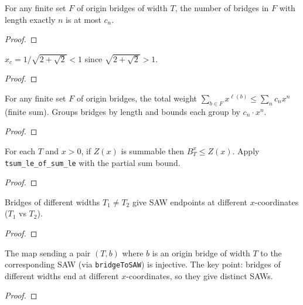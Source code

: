 \begin{lemma}\label{lem:bridge_count_le}
\leanok
{}
  For any finite set $F$ of origin bridges of width $T$, the number of
  bridges in $F$ with length exactly $n$ is at most $c_n$.
\end{lemma}
\begin{proof}
\leanok
{}
\end{proof}

\begin{lemma}[$x_c < 1$]\label{lem:xc_lt_one}
\leanok
{}
  $x_c = 1/\sqrt{2+\sqrt{2}} < 1$ since $\sqrt{2+\sqrt{2}} > 1$.
\end{lemma}
\begin{proof}
\leanok
\end{proof}

\begin{lemma}\label{lem:bridge_sum_le_saw}
\leanok
{}
  For any finite set $F$ of origin bridges, the total weight
  $\sum_{b \in F} x^{\ell(b)} \leq \sum_n c_n x^n$ (finite sum).
  Groups bridges by length and bounds each group by $c_n \cdot x^n$.
\end{lemma}
\begin{proof}
\leanok
{}
\end{proof}

\begin{lemma}[$B_T^x \leq Z(x)$]\label{lem:BT_le_Z}
\leanok
{}
  For each $T$ and $x > 0$, if $Z(x)$ is summable then
  $B_T^x \leq Z(x)$.
  Apply \texttt{tsum\_le\_of\_sum\_le} with the partial sum bound.
\end{lemma}
\begin{proof}
\leanok
{}
\end{proof}

\begin{lemma}\label{lem:disjoint_bridge}
\leanok
{}
  Bridges of different widths $T_1 \neq T_2$ give SAW endpoints
  at different $x$-coordinates ($T_1$ vs $T_2$).
\end{lemma}
\begin{proof}
\leanok
\end{proof}

\begin{lemma}\label{lem:bridge_sigma_inj}
\leanok
{}
  The map sending a pair $(T, b)$ where $b$ is an origin bridge of width $T$
  to the corresponding SAW (via \texttt{bridgeToSAW}) is injective.
  The key point: bridges of different widths end at different $x$-coordinates,
  so they give distinct SAWs.
\end{lemma}
\begin{proof}
\leanok
\end{proof}

